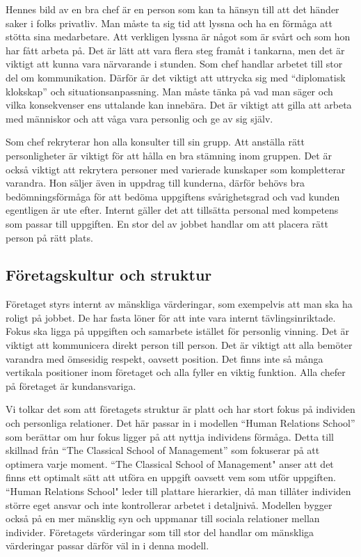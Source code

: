 \documentclass[a4paper,10pt,twoside]{article}
\begin{document}
Hennes bild av en bra chef är en person som kan ta hänsyn till att det händer saker i folks privatliv. Man måste ta sig tid att lyssna och ha en förmåga att stötta sina medarbetare. Att verkligen lyssna är något som är svårt och som hon har fått arbeta på. Det är lätt att vara flera steg framåt i tankarna, men det är viktigt att kunna vara närvarande i stunden. Som chef handlar arbetet till stor del om kommunikation. Därför är det viktigt att uttrycka sig med “diplomatisk klokskap” och situationsanpassning. Man måste tänka på vad man säger och vilka konsekvenser ens uttalande kan innebära. Det är viktigt att gilla att arbeta med människor och att våga vara personlig och ge av sig själv. 

Som chef rekryterar hon alla konsulter till sin grupp. Att anställa rätt personligheter är viktigt för att hålla en bra stämning inom gruppen. Det är också viktigt att rekrytera personer med varierade kunskaper som kompletterar varandra. Hon säljer även in uppdrag till kunderna, därför behövs bra bedömningsförmåga för att bedöma uppgiftens svårighetsgrad och vad kunden egentligen är ute efter. Internt gäller det att tillsätta personal med kompetens som passar till uppgiften. En stor del av jobbet handlar om att placera rätt person på rätt plats. 


\subsection{Företagskultur och struktur} %
\label{sub:företagskultur_och_struktur}
Företaget styrs internt av mänskliga värderingar, som exempelvis att man ska ha roligt på jobbet. De har fasta löner för att inte vara internt tävlingsinriktade. Fokus ska ligga på uppgiften och samarbete istället för personlig vinning. Det är viktigt att kommunicera direkt person till person. Det är viktigt att alla bemöter varandra med ömsesidig respekt, oavsett position. Det finns inte så många vertikala positioner inom företaget och alla fyller en viktig funktion. Alla chefer på företaget är kundansvariga.

Vi tolkar det som att företagets struktur är platt och har stort fokus på individen och personliga relationer. Det här passar in i modellen “Human Relations School” som berättar om hur fokus ligger på att nyttja individens förmåga. Detta till skillnad från “The Classical School of Management” som fokuserar på att optimera varje moment. “The Classical School of Management" anser att det finns ett optimalt sätt att utföra en uppgift oavsett vem som utför uppgiften. “Human Relations School" leder till plattare hierarkier, då man tillåter individen större eget ansvar och inte kontrollerar arbetet i detaljnivå. Modellen bygger också på en mer mänsklig syn och uppmanar till sociala relationer mellan individer. Företagets värderingar som till stor del handlar om mänskliga värderingar passar därför väl in i denna modell.
\end{document}
